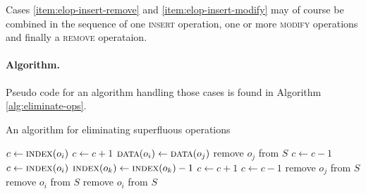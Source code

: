 Cases \ref{item:elop-insert-remove} and \ref{item:elop-insert-modify} may of
course be combined in the sequence of one \textsc{insert} operation, one or more
\textsc{modify} operations and finally a \textsc{remove} operataion.


\paragraph{Algorithm.}
Pseudo code for an algorithm handling those cases is found in Algorithm
\ref{alg:eliminate-ops}.

\begin{algorithm}[p]
  \caption{An algorithm for eliminating superfluous operations}
  \label{alg:eliminate-ops}
  \begin{algorithmic}[5]
        \State $c\gets\textsc{index}(o_i)$
                  \State $c \gets c+1$
                \EndIf
              \EndCase
                  \State $\textsc{data}(o_i) \gets \textsc{data}(o_j)$
                  \State remove $o_j$ from $S$
                \EndIf
              \EndCase
                  \State $c \gets c-1$
                  \State $c \gets \textsc{index}(o_i)$
                          \State $\textsc{index}(o_k) \gets \textsc{index}(o_k) - 1$
                        \Else
                                \State $c \gets c+1$
                              \EndIf
                            \EndCase
                                \State $c \gets c-1$
                              \EndIf
                            \EndCase
                          \EndSwitch
                        \EndIf
                      \EndFor
                      \State remove $o_j$ from $S$
                      \State remove $o_i$ from $S$
                    \EndCase
                      \State remove $o_i$ from $S$
                    \EndCase
                  \EndSwitch
                \EndIf
              \EndCase
            \EndSwitch
          \EndFor
        \EndIf
      \EndFor
    \EndProcedure
  \end{algorithmic}
\end{algorithm}
 
